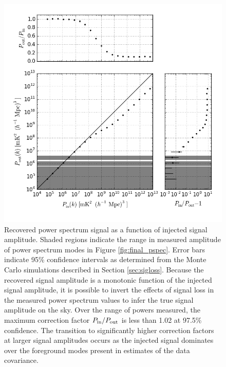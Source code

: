 \documentclass[twocolumn,numberedappendix]{emulateapj} \shorttitle{PSA64}
\begin{document}
\begin{figure}
\centering
\includegraphics[width=\columnwidth]{plots/sigloss.png}
\caption{
Recovered power spectrum signal as a function of injected signal amplitude.  Shaded regions
indicate the range in measured amplitude of power spectrum modes in Figure \ref{fig:final_pspec}.  
Error bars indicate 95\% confidence intervals as determined from the Monte Carlo simulations
described in Section \ref{sec:sigloss}.
Because
the recovered signal amplitude is a monotonic function of the injected signal amplitude,
it is possible to invert the effects of signal loss in the measured power spectrum values
to infer the true signal amplitude on the sky. Over the range of powers measured, the 
maximum correction factor $P_{\rm in}/P_{\rm out}$ is less than 1.02 at 97.5\% confidence.
The transition to significantly higher correction factors at larger signal amplitudes
occurs as the injected signal
dominates over the foreground modes present in estimates of the data covariance.
}\label{fig:signal_loss}
\end{figure}
\end{document}
